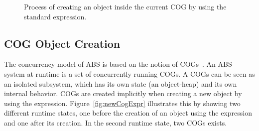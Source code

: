 \begin{figure}
\centering
{}
\caption{Process of creating an object inside the current COG by using the standard  expression.}
\label{fig:newExpr}
\end{figure}

\subsection{COG Object Creation}
The concurrency model of ABS is based on the notion of
COGs~\cite{johnsen10fmco}.
An ABS system at runtime is a set of concurrently running COGs. A COGs can be
seen as an isolated subsystem, which has its own state (an object-heap) and its
own internal behavior. COGs are created implicitly when creating a new object by
using the  expression. Figure~\ref{fig:newCogExpr}
illustrates this by showing two different runtime states, one before the
creation of an object  using the  expression and
one after its creation. In the second runtime state, two COGs exists.

